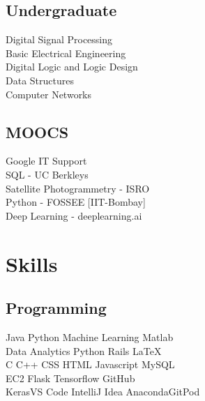 \documentclass[a4paper]{deedy-resume} %
\begin{document}
\begin{minipage}[t]{0.30\textwidth}
\subsection{Undergraduate}

Digital Signal Processing \\
Basic Electrical Engineering \\
Digital Logic and Logic Design \\
Data Structures \\
Computer Networks

\sectionspace %


\subsection{MOOCS}

Google IT Support \\
SQL - UC Berkleys \\
Satellite Photogrammetry - ISRO\\
Python - FOSSEE [IIT-Bombay] \\
Deep Learning - deeplearning.ai \\

\sectionspace %


\section{Skills}

\subsection{Programming}

Java \textbullet{} Python \textbullet{} Machine Learning \textbullet{} Matlab \\
Data Analytics \textbullet{} Python \textbullet{} Rails \textbullet{} \LaTeX\ \\ 
C \textbullet{} C++ \textbullet{} CSS \textbullet{} HTML \textbullet{} Javascript 
\textbullet{} MySQL\\
EC2 \textbullet{} Flask \textbullet{} Tensorflow \textbullet{} GitHub \\
Keras\textbullet{}VS Code\textbullet{} IntelliJ Idea\textbullet{} Anaconda\textbullet{}GitPod


\end{minipage}
\end{document}
